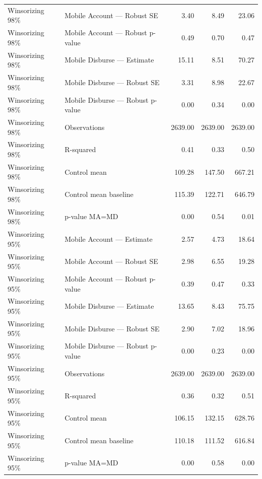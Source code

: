 \begin{tabular}{llrrr}
Winsorizing 98\% & Mobile Account — Robust SE & 3.40 & 8.49 & 23.06\\
Winsorizing 98\% & Mobile Account — Robust p-value & 0.49 & 0.70 & 0.47\\
\addlinespace
Winsorizing 98\% & Mobile Disburse — Estimate & 15.11 & 8.51 & 70.27\\
Winsorizing 98\% & Mobile Disburse — Robust SE & 3.31 & 8.98 & 22.67\\
Winsorizing 98\% & Mobile Disburse — Robust p-value & 0.00 & 0.34 & 0.00\\
Winsorizing 98\% & Observations & 2639.00 & 2639.00 & 2639.00\\
Winsorizing 98\% & R-squared & 0.41 & 0.33 & 0.50\\
\addlinespace
Winsorizing 98\% & Control mean & 109.28 & 147.50 & 667.21\\
Winsorizing 98\% & Control mean baseline & 115.39 & 122.71 & 646.79\\
Winsorizing 98\% & p-value MA=MD & 0.00 & 0.54 & 0.01\\
Winsorizing 95\% & Mobile Account — Estimate & 2.57 & 4.73 & 18.64\\
Winsorizing 95\% & Mobile Account — Robust SE & 2.98 & 6.55 & 19.28\\
\addlinespace
Winsorizing 95\% & Mobile Account — Robust p-value & 0.39 & 0.47 & 0.33\\
Winsorizing 95\% & Mobile Disburse — Estimate & 13.65 & 8.43 & 75.75\\
Winsorizing 95\% & Mobile Disburse — Robust SE & 2.90 & 7.02 & 18.96\\
Winsorizing 95\% & Mobile Disburse — Robust p-value & 0.00 & 0.23 & 0.00\\
Winsorizing 95\% & Observations & 2639.00 & 2639.00 & 2639.00\\
\addlinespace
Winsorizing 95\% & R-squared & 0.36 & 0.32 & 0.51\\
Winsorizing 95\% & Control mean & 106.15 & 132.15 & 628.76\\
Winsorizing 95\% & Control mean baseline & 110.18 & 111.52 & 616.84\\
Winsorizing 95\% & p-value MA=MD & 0.00 & 0.58 & 0.00\\
\bottomrule
\end{tabular}
